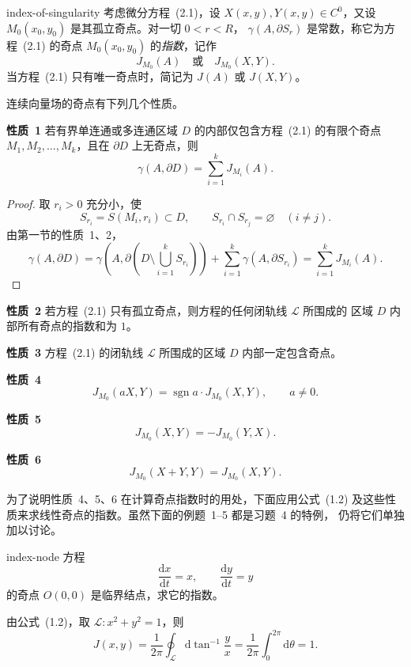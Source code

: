 \begin{definition}{}{index-of-singularity}
考虑微分方程~(2.1)，设 $X(x,y),Y(x,y)\in C^0$，又设
$M_0(x_0,y_0)$ 是其孤立奇点。对一切 $0<r<R$，
$\gamma(A,\partial S_r)$ 是常数，称它为方程~(2.1) 的奇点
$M_0(x_0,y_0)$ 的\emph{指数}，记作
\[
  J_{M_0}(A)\quad\text{或}\quad J_{M_0}(X,Y).
\]
当方程~(2.1) 只有唯一奇点时，简记为 $J(A)$ 或 $J(X,Y)$。
\end{definition}

连续向量场的奇点有下列几个性质。

\noindent\textbf{性质~1}\quad
若有界单连通或多连通区域 $D$ 的内部仅包含方程~(2.1) 的有限个奇点
$M_1,M_2,\ldots,M_k$，且在 $\partial D$ 上无奇点，则
\[
  \gamma(A,\partial D)=\sum_{i=1}^kJ_{M_i}(A). \tag{2.2}
\]

\begin{proof}
取 $r_i>0$ 充分小，使
\[
  S_{r_i}=S(M_i,r_i)\subset D,\qquad
  S_{r_i}\cap S_{r_j}=\varnothing\quad(i\ne j).
\]
由第一节的性质~1、2，
\[
  \gamma(A,\partial D)
  =\gamma\left(A,\partial\left(D\setminus\bigcup_{i=1}^kS_{r_i}\right)\right)
   +\sum_{i=1}^k\gamma(A,\partial S_{r_i})
  =\sum_{i=1}^kJ_{M_i}(A).
\]
\end{proof}

\noindent\textbf{性质~2}\quad
若方程~(2.1) 只有孤立奇点，则方程的任何闭轨线 $\mathscr L$ 所围成的
区域 $D$ 内部所有奇点的指数和为 $1$。

\noindent\textbf{性质~3}\quad
方程~(2.1) 的闭轨线 $\mathscr L$ 所围成的区域 $D$ 内部一定包含奇点。

\noindent\textbf{性质~4}\quad
\[
  J_{M_0}(aX,Y)=\operatorname{sgn}a\cdot J_{M_0}(X,Y),
  \qquad a\ne0.
\]

\noindent\textbf{性质~5}\quad
\[
  J_{M_0}(X,Y)=-J_{M_0}(Y,X).
\]

\noindent\textbf{性质~6}\quad
\[
  J_{M_0}(X+Y,Y)=J_{M_0}(X,Y).
\]

为了说明性质~4、5、6 在计算奇点指数时的用处，下面应用公式~(1.2)
及这些性质来求线性奇点的指数。虽然下面的例题~1--5 都是习题~4 的特例，
仍将它们单独加以讨论。

\begin{example}{}{index-node}
方程
\[
  \dfrac{\mathrm{d}x}{\mathrm{d}t}=x,\qquad
  \dfrac{\mathrm{d}y}{\mathrm{d}t}=y
\]
的奇点 $O(0,0)$ 是临界结点，求它的指数。

\begin{solution}
由公式~(1.2)，取 $\mathscr L:x^2+y^2=1$，则
\[
  J(x,y)=\dfrac{1}{2\pi}\oint_{\mathscr L}
  \mathrm{d}\tan^{-1}\dfrac{y}{x}
  =\dfrac{1}{2\pi}\int_0^{2\pi}\mathrm{d}\theta=1.
\]
\end{solution}
\end{example}

